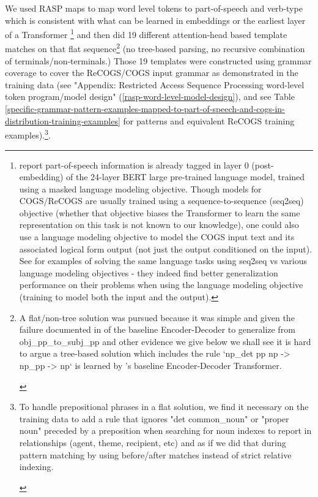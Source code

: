 \documentclass[11pt]{article}
\begin{document}
We used RASP maps to map word level tokens to part-of-speech and verb-type which is consistent with what can be learned in embeddings or the earliest layer of a Transformer \cite{tenney2019bertrediscoversclassicalnlp}\footnote{\cite{tenney2019bertrediscoversclassicalnlp} report part-of-speech information is already tagged in layer 0 (post-embedding) of the 24-layer BERT large pre-trained language model, trained using a masked language modeling objective. Though models for COGS/ReCOGS are usually trained using a sequence-to-sequence (seq2seq) objective (whether that objective biases the Transformer to learn the same representation on this task is not known to our knowledge), one could also use a language modeling objective to model the COGS input text and its associated logical form output (not just the output conditioned on the input). See \cite{10.1162/tacl_a_00733} for examples of solving the same language tasks using seq2seq vs various language modeling objectives - they indeed find better generalization performance on their problems when using the language modeling objective (training to model both the input and the output).} and then did 19 different attention-head based template matches on that flat sequence\footnote{\begin{footnotesize}A flat/non-tree solution was pursued because it was simple and given the failure documented in \cite{Wu2023} of the baseline Encoder-Decoder to generalize from obj\_pp\_to\_subj\_pp and other evidence we give below we shall see it is hard to argue a tree-based solution which includes the rule `np\_det pp np -> np\_pp -> np` is learned by \cite{Wu2023}'s baseline Encoder-Decoder Transformer.\end{footnotesize}} (no tree-based parsing, no recursive combination of terminals/non-terminals.) Those 19 templates were constructed using grammar coverage \cite{fuzzingbook2023:GrammarCoverageFuzzer} to cover the ReCOGS/COGS input grammar as demonstrated in the training data (see "Appendix: Restricted Access Sequence Processing word-level token program/model design" (\ref{rasp-word-level-model-design}), and see Table \ref{specific-grammar-pattern-examples-mapped-to-part-of-speech-and-cogs-in-distribution-training-examples} for patterns and equivalent ReCOGS training examples).\footnote{\begin{footnotesize}To handle prepositional phrases in a flat solution, we find it necessary on the training data to add a rule that ignores "det common\_noun" or "proper noun" preceded by a preposition when searching for noun indexes to report in relationships (agent, theme, recipient, etc) and as if we did that during pattern matching by using before/after matches instead of strict relative indexing.\end{footnotesize}}.
\end{document}
